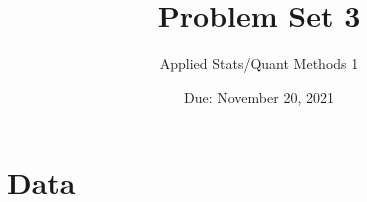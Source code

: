 \documentclass[12pt,letterpaper]{article}
\title{Problem Set 3}
\date{Due: November 20, 2021}
\author{Applied Stats/Quant Methods 1}
\begin{document}
	\maketitle

  \section*{Data} 
  
\end{document}
